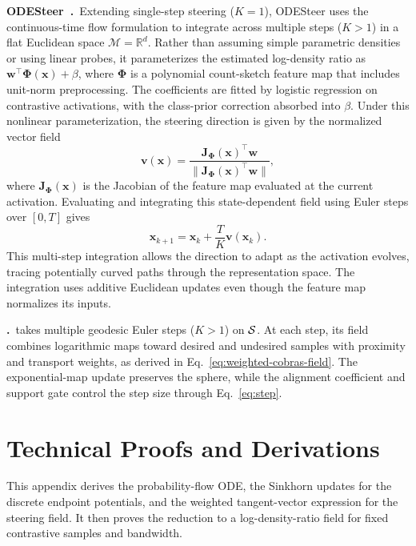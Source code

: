 \noindent\textbf{ODESteer~\citep{zhaoodesteer}.}~Extending single-step steering ($K=1$), ODESteer uses the continuous-time flow formulation to integrate across multiple steps ($K>1$) in a flat Euclidean space $\mathcal{M}=\mathbb{R}^d$. Rather than assuming simple parametric densities or using linear probes, it parameterizes the estimated log-density ratio as $\boldsymbol{w}^{\top}\boldsymbol{\Phi}(\boldsymbol{x})+\beta$, where $\boldsymbol{\Phi}$ is a polynomial count-sketch feature map that includes unit-norm preprocessing. The coefficients are fitted by logistic regression on contrastive activations, with the class-prior correction absorbed into $\beta$. Under this nonlinear parameterization, the steering direction is given by the normalized vector field
\[
\boldsymbol{v}(\boldsymbol{x})
=\frac{\boldsymbol{J}_{\boldsymbol{\Phi}}(\boldsymbol{x})^{\top}\boldsymbol{w}}
{\|\boldsymbol{J}_{\boldsymbol{\Phi}}(\boldsymbol{x})^{\top}\boldsymbol{w}\|},
\]
where $\boldsymbol{J}_{\boldsymbol{\Phi}}(\boldsymbol{x})$ is the Jacobian of the feature map evaluated at the current activation. Evaluating and integrating this state-dependent field using Euler steps over $[0,T]$ gives
\[
\boldsymbol{x}_{k+1}=\boldsymbol{x}_k+\frac{T}{K}\boldsymbol{v}(\boldsymbol{x}_k).
\]
This multi-step integration allows the direction to adapt as the activation evolves, tracing potentially curved paths through the representation space. The integration uses additive Euclidean updates even though the feature map normalizes its inputs.

\noindent\textbf{\Cobras.}~\Cobras takes multiple geodesic Euler steps ($K>1$) on $\mathcal{S}$. At each step, its field combines logarithmic maps toward desired and undesired samples with proximity and transport weights, as derived in Eq.~\eqref{eq:weighted-cobras-field}. The exponential-map update preserves the sphere, while the alignment coefficient and support gate control the step size through Eq.~\eqref{eq:step}.



\section{Technical Proofs and Derivations}
\label{apx:theory}

This appendix derives the probability-flow ODE, the Sinkhorn updates for the discrete endpoint potentials, and the weighted tangent-vector expression for the steering field. It then proves the reduction to a log-density-ratio field for fixed contrastive samples and bandwidth.

